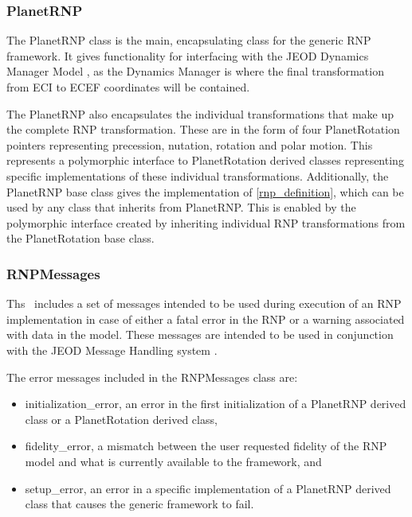 \subsubsection{PlanetRNP}

The PlanetRNP class is the main, encapsulating class for the generic RNP
framework. It gives functionality for interfacing with the JEOD Dynamics Manager
Model \cite{dynenv:DYNMANAGER}, as the Dynamics Manager is where the final
transformation from ECI to ECEF coordinates will be contained.

The PlanetRNP also encapsulates the individual transformations that make up
the complete RNP transformation. These are
in the form of four PlanetRotation pointers
representing precession, nutation, rotation and polar motion. This represents
a polymorphic interface to PlanetRotation derived classes representing
specific implementations of these individual transformations. Additionally,
the PlanetRNP base class gives the implementation of \eqref{rnp_definition},
which can be used by any class that inherits from PlanetRNP. This is
enabled by the polymorphic interface created by inheriting individual
RNP transformations from the PlanetRotation base class.

\subsubsection{RNPMessages}

Ths \ModelDesc\ includes a set of messages intended to be used during execution
of an RNP implementation in case of either a fatal error in the RNP or
a warning associated with data in the model. These messages are intended to be
used in conjunction with the JEOD Message Handling system \cite{dynenv:MESSAGE}.

The error messages included in the RNPMessages class are:

\begin{itemize}
\item{initialization\_error}, an error in the first initialization of a
PlanetRNP derived class or a PlanetRotation derived class,
\item{fidelity\_error}, a mismatch between the user requested fidelity of the
RNP model and what is currently available to the framework, and
\item{setup\_error}, an error in a specific implementation of a PlanetRNP
derived class that causes the generic framework to fail.
\end{itemize}

